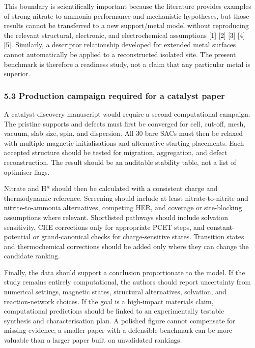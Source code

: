 \documentclass[
]{article}
\begin{document}
This boundary is scientifically important because the literature
provides examples of strong nitrate-to-ammonia performance and
mechanistic hypotheses, but those results cannot be transferred to a new
support/metal model without reproducing the relevant structural,
electronic, and electrochemical assumptions {[}1{]} {[}2{]} {[}3{]}
{[}4{]} {[}5{]}. Similarly, a descriptor relationship developed for
extended metal surfaces cannot automatically be applied to a
reconstructed isolated site. The present benchmark is therefore a
readiness study, not a claim that any particular metal is superior.

\hypertarget{production-campaign-required-for-a-catalyst-paper}{%
\subsubsection{5.3 Production campaign required for a catalyst
paper}\label{production-campaign-required-for-a-catalyst-paper}}

A catalyst-discovery manuscript would require a second computational
campaign. The pristine supports and defects must first be converged for
cell, cut-off, mesh, vacuum, slab size, spin, and dispersion. All 30
bare SACs must then be relaxed with multiple magnetic initialisations
and alternative starting placements. Each accepted structure should be
tested for migration, aggregation, and defect reconstruction. The result
should be an auditable stability table, not a list of optimiser flags.

Nitrate and H* should then be calculated with a consistent charge and
thermodynamic reference. Screening should include at least
nitrate-to-nitrite and nitrite-to-ammonia alternatives, competing HER,
and coverage or site-blocking assumptions where relevant. Shortlisted
pathways should include solvation sensitivity, CHE corrections only for
appropriate PCET steps, and constant-potential or grand-canonical checks
for charge-sensitive states. Transition states and thermochemical
corrections should be added only where they can change the candidate
ranking.

Finally, the data should support a conclusion proportionate to the
model. If the study remains entirely computational, the authors should
report uncertainty from numerical settings, magnetic states, structural
alternatives, solvation, and reaction-network choices. If the goal is a
high-impact materials claim, computational predictions should be linked
to an experimentally testable synthesis and characterisation plan. A
polished figure cannot compensate for missing evidence; a smaller paper
with a defensible benchmark can be more valuable than a larger paper
built on unvalidated rankings.
\end{document}
